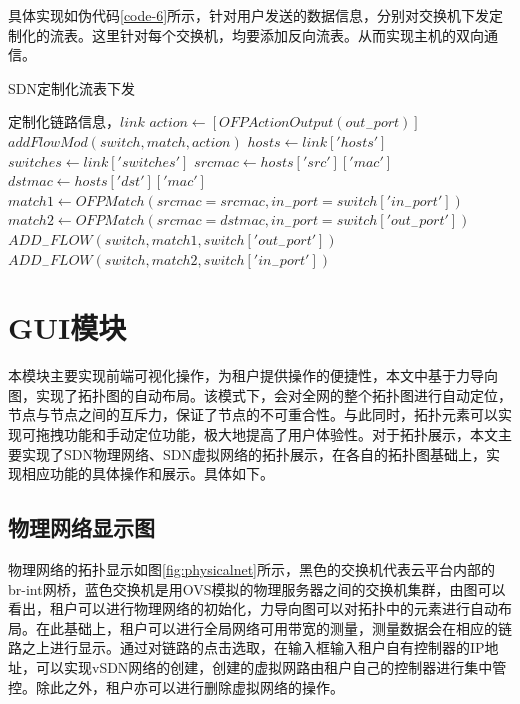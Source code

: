 具体实现如伪代码\ref{code-6}所示，针对用户发送的数据信息，分别对交换机下发定制化的流表。这里针对每个交换机，均要添加反向流表。从而实现主机的双向通信。

\begin{algorithm}[!htb]
    \caption{SDN定制化流表下发}
    \label{code-6}
    \begin{algorithmic}[1] %
        \Require 定制化链路信息，$link$
        	\State $action \gets [OFPActionOutput(out_{-}port)]$
        	\State $addFlowMod(switch,match,action)$
        \EndFunction
        	\State $hosts \gets link['hosts']$
        	\State $switches \gets link['switches']$
        	\State $srcmac \gets hosts['src']['mac']$
        	\State $dstmac \gets hosts['dst']['mac']$
        		\State $match1 \gets OFPMatch(srcmac=srcmac,in_{-}port=switch['in_{-}port'])$
        		\State $match2 \gets OFPMatch(srcmac=dstmac,in_{-}port=switch['out_{-}port'])$
            	\State $ADD_{-}FLOW(switch,match1,switch['out_{-}port'])$
            	\State $ADD_{-}FLOW(switch,match2,switch['in_{-}port'])$
            \EndFor        	
        \EndFunction
    \end{algorithmic}
\end{algorithm}

\section{GUI模块}
本模块主要实现前端可视化操作，为租户提供操作的便捷性，本文中基于力导向图，实现了拓扑图的自动布局。该模式下，会对全网的整个拓扑图进行自动定位，节点与节点之间的互斥力，保证了节点的不可重合性。与此同时，拓扑元素可以实现可拖拽功能和手动定位功能，极大地提高了用户体验性。对于拓扑展示，本文主要实现了SDN物理网络、SDN虚拟网络的拓扑展示，在各自的拓扑图基础上，实现相应功能的具体操作和展示。具体如下。

\subsection{物理网络显示图}
物理网络的拓扑显示如图\ref{fig:physicalnet}所示，黑色的交换机代表云平台内部的br-int网桥，蓝色交换机是用OVS模拟的物理服务器之间的交换机集群，由图可以看出，租户可以进行物理网络的初始化，力导向图可以对拓扑中的元素进行自动布局。在此基础上，租户可以进行全局网络可用带宽的测量，测量数据会在相应的链路之上进行显示。通过对链路的点击选取，在输入框输入租户自有控制器的IP地址，可以实现vSDN网络的创建，创建的虚拟网路由租户自己的控制器进行集中管控。除此之外，租户亦可以进行删除虚拟网络的操作。


